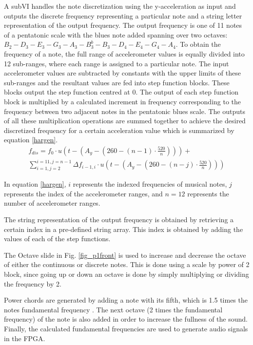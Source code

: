 A subVI handles the note discretization using the y-acceleration as input and outputs the discrete frequency representing a particular note and a string letter representation of the output frequency.
 The output frequency is one of 11 notes of a pentatonic scale with the blues note added spanning over two octaves: \(B_{2} - D_{3} - E_{3} - G_{3} - A_{3} - B^{b}_{3} - B_{3} - D_{4} - E_{4} - G_{4} - A_{4}\).
 To obtain the frequency of a note, the full range of accelerometer values is equally divided into 12 sub-ranges, where each range is assigned to a particular note.
 The input accelerometer values are subtracted by constants with the upper limits of these sub-ranges and the resultant values are fed into step function blocks.
 These blocks output the step function centred at 0.
 The output of each step function block is multiplied by a calculated increment in frequency corresponding to the frequency between two adjacent notes in the pentatonic blues scale.
 The outputs of all these multiplication operations are summed together to achieve the desired discretized frequency for a certain acceleration value which is summarized by equation \ref{hargen}. 
\begin{equation}
\label{hargen}
\begin{split}
 f_{dis}=f_{0}\cdot u \left( t- \left( A_{y}- \left( 260- \left( n-1  \right) \cdot \frac{520}{n} \right) \right) \right) +\\ \sum_{i=1, j=2}^{i=11,j=n-1}\Delta f_{i-1,i} \cdot u\left (t-\left (A_{y}-\left (260- \left( n-j  \right) \cdot \frac{520}{n}  \right) \right) \right)
\end{split}
\end{equation}

In equation \ref{hargen}, $i$ represents the indexed frequencies of musical notes, $j$ represents the index of the accelerometer ranges, and $n = 12$ represents the number of accelerometer ranges.

The string representation of the output frequency is obtained by retrieving a certain index in a pre-defined string array.
 This index is obtained by adding the values of each of the step functions.

The Octave slide in Fig. \ref{fig_p1front} is used to increase and decrease the octave of either the continuous or discrete notes.
 This is done using a scale by power of 2 block, since going up or down an octave is done by simply multiplying or dividing the frequency by 2.

Power chords are generated by adding a note with its fifth, which is 1.5 times the notes fundamental frequency \cite{power_chords}.
 The next octave (2 times the fundamental frequency) of the note is also added in order to increase the fullness of the sound.
 Finally, the calculated fundamental frequencies are used to generate audio signals in the FPGA.

